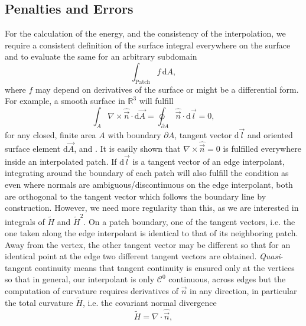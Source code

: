 \documentclass[twocolumn]{biophys-new}
\begin{document}
\subsection*{Penalties and Errors}
For the calculation of the energy, and the consistency of the interpolation, we require a consistent definition of the surface integral everywhere on the surface and to evaluate the same for an arbitrary subdomain
\begin{equation}
  \int_\mathrm{Patch} f \, \mathrm{d}A, 
\end{equation}
where $f$ may depend on derivatives of the surface or might be a differential form.
For example, a smooth surface in $\mathbb{R}^3$ will fulfill
\begin{equation}
 \int_A  \nabla \times \hat{\vec{n}}  \cdot \mathrm{d}\vec{A} = \oint_{\partial A}  \hat{\vec{n}} \cdot \mathrm{d} \vec{l} = 0,
\end{equation}
for any closed, finite area $A$ with boundary $\partial A$, tangent vector $\mathrm{d}\vec{l}$ and oriented surface element $\mathrm{d}\vec{A}$, and . It is easily shown that $\nabla \times \hat{\vec{n}} = 0 $ is fulfilled everywhere inside an interpolated patch. If $\mathrm{d}\vec{l}$ is a tangent vector of an edge interpolant, integrating around the boundary of each patch will also fulfill the condition as even where normals are ambiguous/discontinuous on the edge interpolant, both are orthogonal to the tangent vector which follows the boundary line by construction. 
However, we need more regularity than this, as we are interested in integrals of $\tilde{H}$ and $\tilde{H}^2$. On a patch boundary, one of the tangent vectors, i.e. the one taken along the edge interpolant is identical to that of its neighboring patch. Away from the vertex, the other tangent vector may be different so that for an identical point at the edge two different tangent vectors are obtained. \textit{Quasi}-tangent continuity means that tangent continuity is ensured only at the vertices so that
in general, our interpolant is only $\mathcal{C}^0$ continuous, across edges but the computation of curvature requires derivatives of $\vec{n}$ in any direction, in particular the total curvature $\tilde{H}$, i.e. the covariant normal divergence
\begin{equation}
  \tilde{H}  = \nabla \cdot \hat{\vec{n}},
\end{equation}
\end{document}
